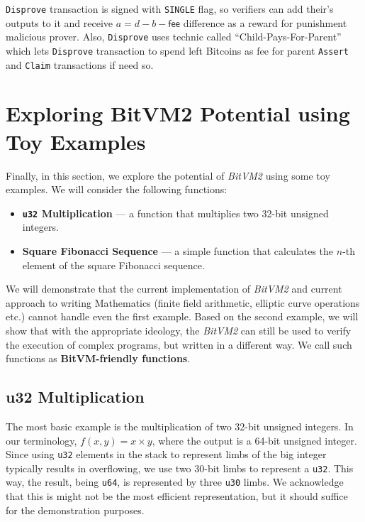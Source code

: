 \documentclass{iacrtrans}
\begin{document}
\texttt{Disprove} transaction is signed with \texttt{SINGLE} flag, so
verifiers can add their's outputs to it and receive
$a = d - b- \mathsf{fee}$ difference as a reward for punishment
malicious prover. Also, \texttt{Disprove} uses technic called
``Child-Pays-For-Parent'' which lets \texttt{Disprove} transaction to
spend left Bitcoins as fee for parent \texttt{Assert} and
\texttt{Claim} transactions if need so.

\section{Exploring BitVM2 Potential using Toy
  Examples}\label{sec:covenants-emulation}

Finally, in this section, we explore the potential of \textit{BitVM2}
using some toy
examples. We will consider the following functions:
\begin{itemize}
  \item \textbf{\texttt{u32} Multiplication} --- a function that
    multiplies two 32-bit unsigned integers.
  \item \textbf{Square Fibonacci Sequence} --- a simple function that
    calculates the $n$-th element of the square Fibonacci sequence.
\end{itemize}

We will demonstrate that the current implementation of
\textit{BitVM2} and current
approach to writing Mathematics (finite field arithmetic, elliptic curve
operations etc.) cannot handle even the first example. Based on the second
example, we will show that with the appropriate ideology, the
\textit{BitVM2} can still
be used to verify the execution of complex programs, but written in a different
way. We call such functions as \textbf{BitVM-friendly functions}.
\subsection{u32 Multiplication}

The most basic example is the multiplication of two 32-bit unsigned integers. In
our terminology, $f(x,y) = x \times y$, where the output is a 64-bit unsigned
integer. Since using \texttt{u32} elements in the stack to represent limbs of
the big integer typically results in overflowing, we use two $30$-bit limbs to
represent a \texttt{u32}. This way, the result, being \texttt{u64}, is
represented by three \texttt{u30} limbs. We acknowledge that this is might not
be the most efficient representation, but it should suffice for the
demonstration purposes.
\end{document}
